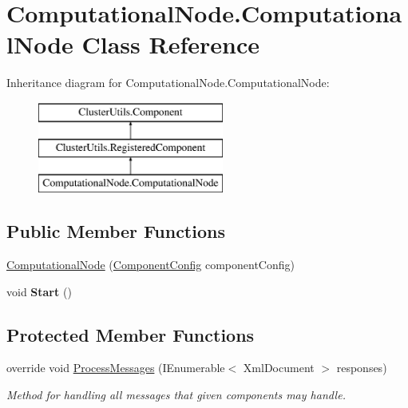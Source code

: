 \hypertarget{class_computational_node_1_1_computational_node}{}\section{Computational\+Node.\+Computational\+Node Class Reference}
\label{class_computational_node_1_1_computational_node}
Inheritance diagram for Computational\+Node.\+Computational\+Node\+:\begin{figure}[H]
\begin{center}
\leavevmode
\includegraphics[height=3.000000cm]{class_computational_node_1_1_computational_node}
\end{center}
\end{figure}
\subsection*{Public Member Functions}
\begin{DoxyCompactItemize}
\item 
\hyperlink{class_computational_node_1_1_computational_node_a04b0aa3eac135d07f8886d63577bd5f0}{Computational\+Node} (\hyperlink{class_cluster_utils_1_1_component_config}{Component\+Config} component\+Config)
\item 
\hypertarget{class_computational_node_1_1_computational_node_a56a929cfb1edb87ac11242fe81048b43}{}void {\bfseries Start} ()\label{class_computational_node_1_1_computational_node_a56a929cfb1edb87ac11242fe81048b43}

\end{DoxyCompactItemize}
\subsection*{Protected Member Functions}
\begin{DoxyCompactItemize}
\item 
override void \hyperlink{class_computational_node_1_1_computational_node_ae7e1583dbbdcdc24d4b342657c4e2d5e}{Process\+Messages} (I\+Enumerable$<$ Xml\+Document $>$ responses)
\begin{DoxyCompactList}\small\item\em Method for handling all messages that given components may handle. \end{DoxyCompactList}\end{DoxyCompactItemize}
